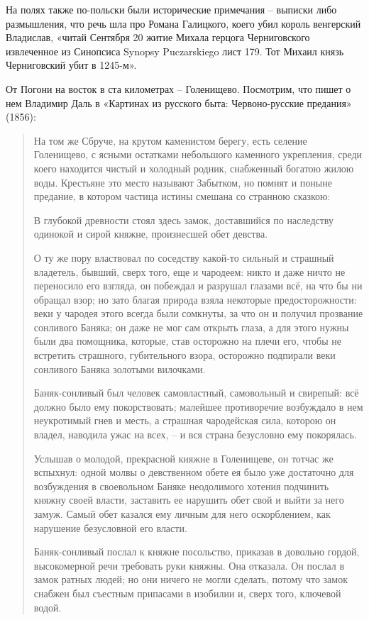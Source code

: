 На полях также по-польски были исторические примечания – выписки либо размышления, что речь шла про Романа Галицкого, коего убил король венгерский Владислав, «читай Сентября 20 житие Михала герцога Черниговского извлеченное из Синопсиса Synopsy Puczarskiego лист 179. Тот Михаил князь Черниговский убит в 1245-м».

От Погони на восток в ста километрах – Голенищево. Посмотрим, что пишет о нем 
Владимир Даль в «Картинах из русского быта: Червоно-русские предания» (1856):

\begin{quotation}
На том же Сбруче, на крутом каменистом берегу, есть селение Голенищево, с ясными остатками небольшого каменного укрепления, среди коего находится чистый и холодный родник, снабженный богатою жилою воды. Крестьяне это место называют Забытком, но помнят и поныне предание, в котором частица истины смешана со странною сказкою:

В глубокой древности стоял здесь замок, доставшийся по наследству одинокой и сирой княжне, произнесшей обет девства. 

О ту же пору властвовал по соседству какой-то сильный и страшный владетель, бывший, сверх того, еще и чародеем: никто и даже ничто не переносило его взгляда, он побеждал и разрушал глазами всё, на что бы ни обращал взор; но зато благая природа взяла некоторые предосторожности: веки у чародея этого всегда были сомкнуты, за что он и получил прозвание сонливого Баняка; он даже не мог сам открыть глаза, а для этого нужны были два помощника, которые, став осторожно на плечи его, чтобы не встретить страшного, губительного взора, осторожно подпирали веки сонливого Баняка золотыми вилочками.

Баняк-сонливый был человек самовластный, самовольный и свирепый: всё должно было ему покорствовать; малейшее противоречие возбуждало в нем неукротимый гнев и месть, а страшная чародейская сила, которою он владел, наводила ужас на всех, – и вся страна безусловно ему покорялась.

Услышав о молодой, прекрасной княжне в Голенищеве, он тотчас же вспыхнул: одной молвы о девственном обете ея было уже достаточно для возбуждения в своевольном Баняке неодолимого хотения подчинить княжну своей власти, заставить ее нарушить обет свой и выйти за него замуж. Самый обет казался ему личным для него оскорблением, как нарушение безусловной его власти.

Баняк-сонливый послал к княжне посольство, приказав в довольно гордой, высокомерной речи требовать руки княжны. Она отказала. Он послал в замок ратных людей; но они ничего не могли сделать, потому что замок снабжен был съестным припасами в изобилии и, сверх того, ключевой водой.


\end{quotation}
